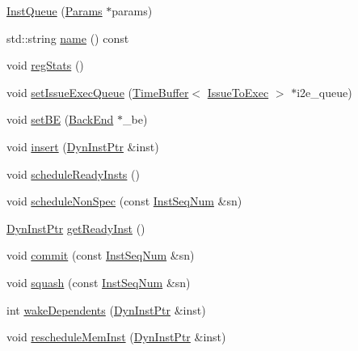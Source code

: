 \begin{DoxyCompactItemize}
\item 
\hyperlink{classBackEnd_1_1InstQueue_a679ee5512f178ea331ab7cd3ebf2aa78}{InstQueue} (\hyperlink{classBackEnd_a818e103eae798a24a06a0a34631849ea}{Params} $\ast$params)
\item 
std::string \hyperlink{classBackEnd_1_1InstQueue_a37627d5d5bba7f4a8690c71c2ab3cb07}{name} () const 
\item 
void \hyperlink{classBackEnd_1_1InstQueue_a4dc637449366fcdfc4e764cdf12d9b11}{regStats} ()
\item 
void \hyperlink{classBackEnd_1_1InstQueue_adff8385686f237650837ba2fbf13e5da}{setIssueExecQueue} (\hyperlink{classTimeBuffer}{TimeBuffer}$<$ \hyperlink{structBackEnd_1_1SizeStruct}{IssueToExec} $>$ $\ast$i2e\_\-queue)
\item 
void \hyperlink{classBackEnd_1_1InstQueue_ac17b73ac697edccbae68bdb271673c35}{setBE} (\hyperlink{classBackEnd}{BackEnd} $\ast$\_\-be)
\item 
void \hyperlink{classBackEnd_1_1InstQueue_a773e88db1aa010c3755e603493bf40ec}{insert} (\hyperlink{classBackEnd_a028ce10889c5f6450239d9e9a7347976}{DynInstPtr} \&inst)
\item 
void \hyperlink{classBackEnd_1_1InstQueue_a3694e72427d3a616808797f9343d1fc4}{scheduleReadyInsts} ()
\item 
void \hyperlink{classBackEnd_1_1InstQueue_acc2640b7a23376539d13b74725fcf7a9}{scheduleNonSpec} (const \hyperlink{inst__seq_8hh_a258d93d98edaedee089435c19ea2ea2e}{InstSeqNum} \&sn)
\item 
\hyperlink{classBackEnd_a028ce10889c5f6450239d9e9a7347976}{DynInstPtr} \hyperlink{classBackEnd_1_1InstQueue_adafbd3336dfa623082983831f3063993}{getReadyInst} ()
\item 
void \hyperlink{classBackEnd_1_1InstQueue_aa72e9e4af0c8be21a633bea0bf0b5fe1}{commit} (const \hyperlink{inst__seq_8hh_a258d93d98edaedee089435c19ea2ea2e}{InstSeqNum} \&sn)
\item 
void \hyperlink{classBackEnd_1_1InstQueue_adc9b67ce59b0b2e930cfaf6361ce42c5}{squash} (const \hyperlink{inst__seq_8hh_a258d93d98edaedee089435c19ea2ea2e}{InstSeqNum} \&sn)
\item 
int \hyperlink{classBackEnd_1_1InstQueue_adc3bb738d2526d7074ee2a17b7c34bc4}{wakeDependents} (\hyperlink{classBackEnd_a028ce10889c5f6450239d9e9a7347976}{DynInstPtr} \&inst)
\item 
void \hyperlink{classBackEnd_1_1InstQueue_aa9c46f45f491ef90a936c7e2b95f20aa}{rescheduleMemInst} (\hyperlink{classBackEnd_a028ce10889c5f6450239d9e9a7347976}{DynInstPtr} \&inst)

\end{DoxyCompactItemize}
